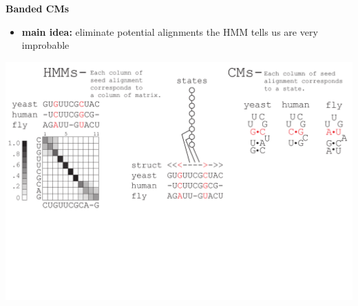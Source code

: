 \documentclass[landscape]{slides}
\begin{document}
\begin{slide}
\begin{center}
\large
\textbf{Banded CMs}
\end{center}
\medskip
\small
\begin{itemize}
\item
\textbf{main idea:} eliminate potential alignments the HMM tells us are very improbable
\end{itemize}
\begin{center}
\includegraphics[width=8in]{figs/post_hmm_to_cm_map2_layer5}
\end{center}
\vfill
\end{slide}
\end{document}
